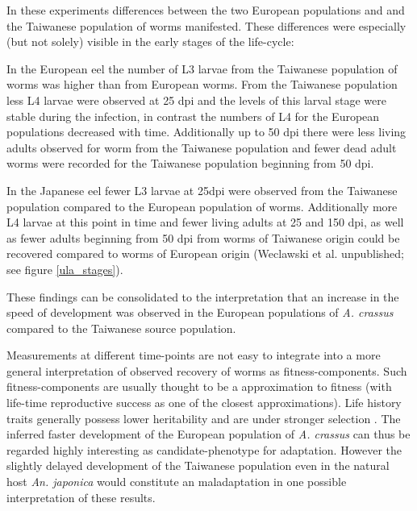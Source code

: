 In these experiments differences between the two European populations
and and the Taiwanese population of worms manifested. These
differences were especially (but not solely) visible in the early
stages of the life-cycle:

In the European eel the number of L3 larvae from the Taiwanese
population of worms was higher than from European worms. From the
Taiwanese population less L4 larvae were observed at 25 dpi and the
levels of this larval stage were stable during the infection, in
contrast the numbers of L4 for the European populations decreased with
time. Additionally up to 50 dpi there were less living adults
observed for worm from the Taiwanese population and fewer dead adult
worms were recorded for the Taiwanese population beginning from 50
dpi.

In the Japanese eel fewer L3 larvae at 25dpi were observed from the
Taiwanese population compared to the European population of
worms. Additionally more L4 larvae at this point in time and fewer
living adults at 25 and 150 dpi, as well as fewer adults beginning
from 50 dpi from worms of Taiwanese origin could be recovered compared
to worms of European origin (Weclawski et al. unpublished; see figure
\ref{ula_stages}).

These findings can be consolidated to the interpretation that an
increase in the speed of development was observed in the European
populations of \textit{A. crassus} compared to the Taiwanese source
population.

Measurements at different time-points are not easy to integrate into a
more general interpretation of observed recovery of worms as
fitness-components. Such fitness-components are usually thought to be
a approximation to fitness (with life-time reproductive success as one
of the closest approximations). Life history traits generally possess
lower heritability and are under stronger selection
\cite{pmid3316130}. The inferred faster development of the European
population of \textit{A. crassus} can thus be regarded highly
interesting as candidate-phenotype for adaptation. However the slightly
delayed development of the Taiwanese population even in the natural
host \textit{An. japonica} would constitute an maladaptation
\cite{pmid21708731} in one possible interpretation of these results.

